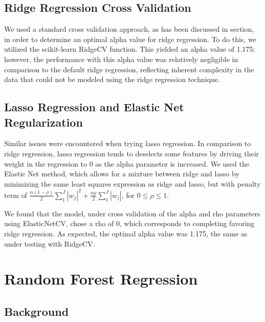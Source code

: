 \documentclass{article}
\begin{document}
\subsection{Ridge Regression Cross Validation}

We used a standard cross validation approach, as has been discussed in section, in order to determine an optimal alpha value for ridge regression. To do this, we utilized the scikit-learn RidgeCV function. This yielded an alpha value of 1.175; however, the performance with this alpha value was relatively negligible in comparison to the default ridge regression, reflecting inherent complexity in the data that could not be modeled using the ridge regression technique.

\subsection{Lasso Regression and Elastic Net Regularization}

Similar issues were encountered when trying lasso regression. In comparison to ridge regression, lasso regression tends to deselects some features by driving their weight in the regression to 0 as the alpha parameter is increased. We used the Elastic Net method, which allows for a mixture between ridge and lasso by minimizing the same least squares expression as ridge and lasso, but with penalty term of $\frac{\alpha (1-\rho )}{2} \sum_1^J |w_j|^2 + \frac{\alpha \rho }{2} \sum_1^J |w_j|$, for $0 \leq \rho \leq 1$.

We found that the model, under cross validation of the alpha and rho parameters using ElasticNetCV, chose a rho of 0, which corresponds to completing favoring ridge regression. As expected, the optimal alpha value was 1.175, the same as under testing with RidgeCV.

\section{Random Forest Regression}

\subsection{Background}
\end{document}
